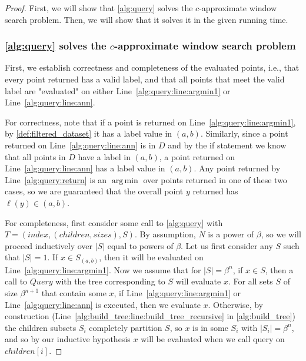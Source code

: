\documentclass{article}
\theoremstyle{plain}
\theoremstyle{definition}
\theoremstyle{remark}
\DeclareMathOperator*{\argmin}{arg\,min}
\newcommand{\julian}[1]{{\color{red}{\bf Julian:} #1}}
\begin{document}
\runtime*
\begin{proof}

First, we will show that \cref{alg:query} solves the $c$-approximate window search problem. Then, we will show that it solves it in the given running time.

\subsubsection*{\cref{alg:query} solves the $c$-approximate window search problem}

First, we establish correctness and completeness of the evaluated points, i.e., that every point returned has a valid label, and that all points that meet the valid label are "evaluated" on either Line~\ref{alg:query:line:argmin1} or Line~\ref{alg:query:line:ann}.

For correctness, note that if a point is returned on Line~\ref{alg:query:line:argmin1}, by \cref{def:filtered_dataset} it has a label value in $(a, b)$. Similarly, since a point returned on Line~\ref{alg:query:line:ann} is in $D$ and by the if statement we know that all points in $D$ have a label in $(a, b)$, a point returned on Line~\ref{alg:query:line:ann} has a label value in $(a, b)$. Any point returned by Line~\ref{alg:query:return} is an $\argmin$ over points returned in one of these two cases, so we are guaranteed that the overall point $y$ returned has $\ell(y) \in (a, b)$.

For completeness, first consider some call to \cref{alg:query} with $T = (index, (children, sizes), S)$. 
By assumption, $N$ is a power of $\beta$, so we will proceed inductively over $|S|$ equal to powers of $\beta$. Let us first consider any $S$ such that $|S| = 1$. If $x \in S_{(a, b)}$, then it will be evaluated on Line~\ref{alg:query:line:argmin1}. Now we assume that for $|S| = \beta^n$, if $x \in S$, then a call to $Query$ with the tree corresponding to $S$ will evaluate $x$. For all sets $S$ of size $\beta^{n + 1}$ that contain some $x$, if Line~\ref{alg:query:line:argmin1} or Line~\ref{alg:query:line:ann} is executed, then we evaluate $x$. Otherwise, by construction (Line~\ref{alg:build_tree:line:build_tree_recursive} in \cref{alg:build_tree}) the children subsets $S_i$ completely partition $S$, so $x$ is in some $S_i$ with $|S_i| = \beta^{n}$, and so by our inductive hypothesis $x$ will be evaluated when we call query on $children[i]$.


\end{proof}
\end{document}
